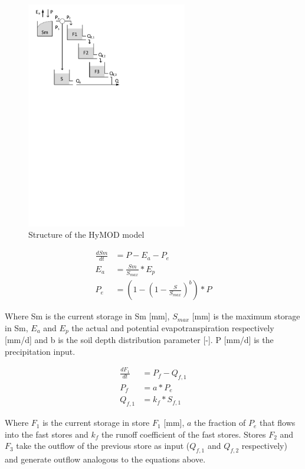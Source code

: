 { 																	%
\begin{figure}
\includegraphics[trim=1cm 18.5cm 7cm 1cm,width=7cm,keepaspectratio]{./AppA_files/29_schematic.pdf}
\caption{Structure of the HyMOD model} \label{fig:29_schematic}
\end{figure}

\begin{align}
	\frac{dSm}{dt} &= P-E_a-P_e \\
	E_a &= \frac{Sm}{S_{max}}*E_p\\
	P_e &= \left(1-\left(1-\frac{S}{S_{max}}\right)^b\right)*P
\end{align}

Where Sm is the current storage in Sm [mm], $S_{max}$ [mm] is the maximum storage in Sm, $E_a$ and $E_p$ the actual and potential evapotranspiration respectively [mm/d] and b is the soil depth distribution parameter [-]. P [mm/d] is the precipitation input.

\begin{align}
	\frac{dF_1}{dt} &= P_f - Q_{f,1}\\
	P_f &= a*P_e \\
	Q_{f,1} &= k_f*S_{f,1} 
\end{align}

} %

\noindent Where $F_1$ is the current storage in store $F_1$ [mm], $a$ the fraction of $P_e$ that flows into the fast stores and $k_f$ the runoff coefficient of the fast stores. Stores $F_2$ and $F_3$ take the outflow of the previous store as input ($Q_{f,1}$ and $Q_{f,2}$ respectively) and generate outflow analogous to the equations above.

